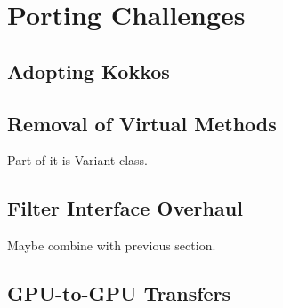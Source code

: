 \section{Porting Challenges}

\subsection{Adopting Kokkos}


\subsection{Removal of Virtual Methods}


Part of it is Variant class.

\subsection{Filter Interface Overhaul}


Maybe combine with previous section.

\subsection{GPU-to-GPU Transfers}

